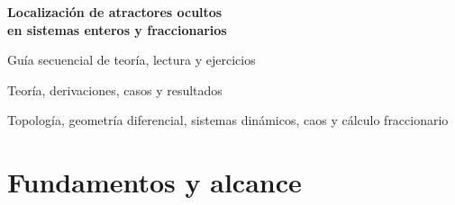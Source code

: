 \documentclass[11pt,a4paper]{article}
\numberwithin{equation}{section}
\newif\ifHAFOPedagogy
\begin{document}
\hypersetup{pageanchor=false}
\begin{titlepage}
\centering
\vspace*{0.18\textheight}
{\LARGE\bfseries Localización de atractores ocultos\\[0.35em]
en sistemas enteros y fraccionarios\par}
\vspace{1.2em}
\ifdefined\HAFOPrintEdition
  {\Large Guía secuencial de teoría, lectura y ejercicios\par}
\else
  {\Large Teoría, derivaciones, casos y resultados\par}
\fi
\vfill
{\large Topología, geometría diferencial, sistemas dinámicos, caos y
cálculo fraccionario\par}
\end{titlepage}

\ifdefined\HAFOPrintEdition
\clearpage
\tableofcontents
\else
\tableofcontents
\fi
\clearpage
\hypersetup{pageanchor=true}

\ifHAFOPedagogy
  \part[Curso básico integrado]{Curso básico integrado: sistemas dinámicos,
  caos, cálculo fraccionario, topología y teoría geométrica de EDO}
\else
  \part{Fundamentos y alcance}
\fi
\label{part:guia-geometrica-entera}

\ifHAFOPedagogy
  

  \clearpage
  \begingroup
  \def\HAFOModelsOnly{1}
  
  \endgroup

  \begingroup
  \def\HAFONoGeoPosterior{1}
  \def\HAFOGeoBlockSelect{1}
  \def\HAFOGeoBlockIntroFlow{1}
  
  \endgroup
  \begingroup
  \def\HAFOFractionalOnly{1}
  \def\HAFOFractionalBlockSelect{1}
  \def\HAFOFractionalBlockOperators{1}
  
  \endgroup
  \begingroup
  \def\HAFOCaputoBlockSelect{1}
  \def\HAFOCaputoBlockMemory{1}
  
  \endgroup
  \HAFOProblemStateMemory

  \begingroup
  \def\HAFONoGeoPosterior{1}
  \def\HAFOGeoBlockSelect{1}
  \def\HAFOGeoBlockLinear{1}
  
  \endgroup
    \begingroup
    \def\HAFONoGeoPosterior{1}
    \def\HAFOGeoBlockSelect{1}
    \def\HAFOGeoBlockBasins{1}
    
    \endgroup
  \begingroup
  \def\HAFOFractionalOnly{1}
  \def\HAFOFractionalBlockSelect{1}
  \def\HAFOFractionalBlockStability{1}
  
  \endgroup
    \begingroup
    \def\HAFOCaputoBlockSelect{1}
    \def\HAFOCaputoBlockBasins{1}
    
    \endgroup
    \HAFOProblemStabilityBasins
\end{document}
